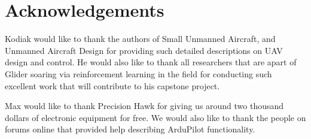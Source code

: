 \documentclass[12pt,journal,compsoc]{IEEEtran}
\begin{document}
\section*{Acknowledgements}
Kodiak would like to thank the authors of Small Unmanned Aircraft, and Unmanned Aircraft Design for providing such detailed descriptions on UAV design and control. He would also like to thank all researchers that are apart of Glider soaring via reinforcement learning in the field \cite{GliderBirds} for conducting such excellent work that will contribute to his capstone project.

Max would like to thank Precision Hawk for giving us around two thousand dollars of electronic equipment for free. We would also like to thank the people on forums online that provided help describing ArduPilot functionality.
\end{document}
